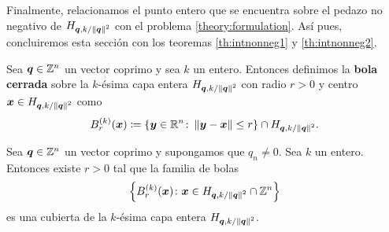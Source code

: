 Finalmente, relacionamos el punto entero que se encuentra sobre el pedazo no negativo de
$H_{\boldsymbol{\boldsymbol{q}}, k/\left\lVert \boldsymbol{\boldsymbol{q}} \right\rVert^{2}}$ con el problema \eqref{theory:formulation}. Así pues, concluiremos
esta sección con los teoremas \ref{th:intnonneg1} y \ref{th:intnonneg2}.

\begin{definition}
	\label{fin:def:ball}
	Sea $\boldsymbol{q} \in \mathbb{Z}^n$ un vector coprimo y sea $k$ un entero. Entonces definimos la
	\textbf{bola cerrada} sobre la $k$-ésima capa entera $H_{\boldsymbol{\boldsymbol{q}}, k/\left\lVert \boldsymbol{\boldsymbol{q}} \right\rVert^{2}}$ con
	radio $r > 0$ y centro $\boldsymbol{x} \in H_{\boldsymbol{\boldsymbol{q}}, k/\left\lVert \boldsymbol{\boldsymbol{q}} \right\rVert^{2}}$ como
	\begin{equation}
		\label{eq:k-ball}
		B_r^{(k)}(\boldsymbol{x}) \coloneq \lbrace \boldsymbol{y} \in \mathbb{R}^n \colon \left\lVert \boldsymbol{y} - \boldsymbol{x} \right\rVert \leq r
	\rbrace \cap H_{\boldsymbol{\boldsymbol{q}}, k/\left\lVert \boldsymbol{\boldsymbol{q}} \right\rVert^{2}}.
	\end{equation}
\end{definition}
\begin{theorem}
	\label{lemma:ball-cover}
	Sea $\boldsymbol{q} \in \mathbb{Z}^n$ un vector coprimo y supongamos que $q_n \neq 0$. Sea $k$ un entero.
	Entonces existe $r > 0$ tal que la familia de bolas
	\begin{equation*}
		\left\lbrace B_r^{(k)}(\boldsymbol{x}) \colon \boldsymbol{x} \in H_{\boldsymbol{\boldsymbol{q}}, k/\left\lVert \boldsymbol{\boldsymbol{q}} \right\rVert^{2}} \cap
			\mathbb{Z}^n \right\rbrace
	\end{equation*}
	es una cubierta de la $k$-ésima capa entera $H_{\boldsymbol{\boldsymbol{q}}, k/\left\lVert \boldsymbol{\boldsymbol{q}} \right\rVert^{2}}$.
\end{theorem}
